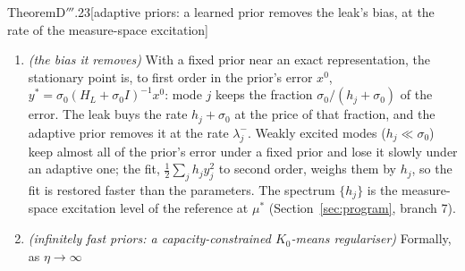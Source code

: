 \begin{thm}{Theorem}{D$'''$.23}[adaptive priors: a learned prior removes the leak's bias, at the rate of the
measure-space excitation]
\begin{enumerate}[label=\textup{(\roman*)}]
    weighted coordinates $y_k := \sqrt{q_k}G^{-1/2}\bar u_k$, $x_k := \sqrt{q_k}G^{-1/2}\zeta_k$ it reads
    $\dot y = -H_Ly - \sigma_0(y - x)$, $\dot x = -\eta(x - y)$, with the Gauss--Newton block
    $H_L := [\sqrt{q_kq_l}G^{1/2}\langle\nabla_\vartheta\tilde\Phi(\cdot\,;\vartheta^*_k)^\T
    \nabla_\vartheta\tilde\Phi(\cdot\,;\vartheta^*_l)\rangle_\rho G^{1/2}]_{kl}\succeq0$ (eigenvalues
    $h_1\le\dots\le h_{pK_0}$). On its eigenvectors every pair evolves by
    $\bigl[\begin{smallmatrix}-(h_j + \sigma_0) & \sigma_0\\ \eta & -\eta\end{smallmatrix}\bigr]$, whose rates
    $\lambda_j^\pm$ are the roots of $\lambda^2 - (h_j + \sigma_0 + \eta)\lambda + \eta h_j = 0$; for $h_j,\eta > 0$
    the slower one satisfies
    \[
      \eta h_j/(h_j + \sigma_0 + \eta) < \lambda_j^- < \min\{h_j,\eta\},
    \]
    the lower bound being tight as $\eta\to0$; $\lambda_j^- = 0$ if $h_j\eta = 0$ and $\lambda_j^- = h_j$ at
    $\eta = \infty$; and $\lambda^-$ increases with $h$
    ($\dd\lambda^-/\dd h = (\eta - \lambda^-)/(\lambda^+ - \lambda^-) > 0$), so the slowest collective rate is
    $\lambda_1^-$. So the adaptive prior's convergence in mode $j$ is never faster than the loss's own curvature
    $h_j$, while a fixed prior's is $h_j + \sigma_0$; in an unexcited mode ($h_j = 0$) $\lambda_j^- = 0$, and the
    network and the prior drift together, as an adaptive law without a leak does without persistent excitation. The
    pair matrix is self-adjoint in the metric of (i) (in the coordinates $(y_j,(\sigma_0/\eta)^{1/2}x_j)$ it is
    symmetric, with off-diagonal $(\sigma_0\eta)^{1/2}$).
  \item \emph{(the bias it removes)} With a fixed prior near an exact representation, the stationary point is, to
    first order in the prior's error $x^0$, $y^* = \sigma_0(H_L + \sigma_0I)^{-1}x^0$: mode $j$ keeps the fraction
    $\sigma_0/(h_j + \sigma_0)$ of the error. The leak buys the rate $h_j + \sigma_0$ at the price of that fraction,
    and the adaptive prior removes it at the rate $\lambda_j^-$. Weakly excited modes ($h_j\ll\sigma_0$) keep almost
    all of the prior's error under a fixed prior and lose it slowly under an adaptive one; the fit,
    $\frac12\sum_jh_jy_j^2$ to second order, weighs them by $h_j$, so the fit is restored faster than the parameters.
    The spectrum $\{h_j\}$ is the measure-space excitation level of the reference at $\mu^*$
    (Section~\ref{sec:program}, branch 7).
  \item \emph{(infinitely fast priors: a capacity-constrained $K_0$-means regulariser)} Formally, as $\eta\to\infty$

\end{enumerate}
\end{thm}
